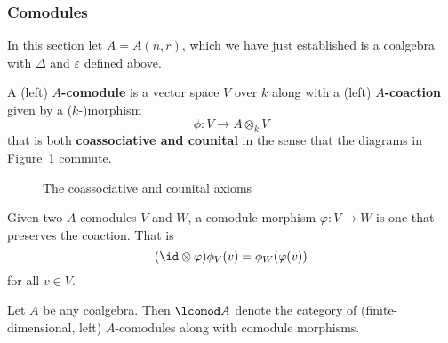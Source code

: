 \documentclass[12pt]{article}
\begin{document}
\subsubsection{Comodules}
In this section let $A=A(n,r)$, which we have just established is a coalgebra with $\Delta$ and $\varepsilon$ defined above.
\begin{defn}
	A (left) \textbf{$A$-comodule} is a vector space $V$ over $k$ along with a (left) \textbf{$A$-coaction} given by a ($k$-)morphism 
	\[\phi:V\to A\otimes_k V\]
	that is both \textbf{coassociative and counital} in the sense that the diagrams in Figure~\ref{fig:comodule} commute.
\end{defn}
\begin{figure}
	\centering
	\qquad 
	\caption{The coassociative and counital axioms}
	\label{fig:comodule}
\end{figure}

Given two $A$-comodules $V$ and $W$, a comodule morphism $\varphi:V\to W$ is one that preserves the coaction. That is 
\[(\id\otimes\varphi)\phi_V(v)=\phi_W(\varphi(v))\]
for all $v\in V$.

\begin{defn}
	Let $A$ be any coalgebra. Then $\lcomod A$ denote the category of (finite-dimensional, left) $A$-comodules along with comodule morphisms.
\end{defn}
\end{document}
